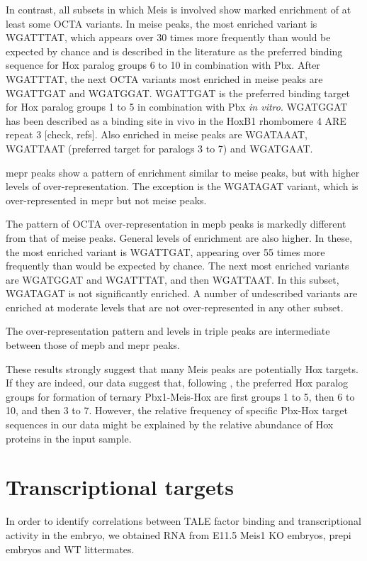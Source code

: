 In contrast, all subsets in which Meis is involved show marked enrichment of at least some \ac{OCTA} variants. In \ac{meise} peaks, the most enriched variant is WGATTTAT, which appears over 30 times more frequently than would be expected by chance and is described in the literature as the preferred binding sequence for Hox paralog groups 6 to 10 in combination with Pbx. After WGATTTAT, the next \ac{OCTA} variants most enriched in \ac{meise} peaks are WGATTGAT and WGATGGAT. WGATTGAT is the preferred binding target for Hox paralog groups 1 to 5 in combination with Pbx \textit{in vitro}. WGATGGAT has been described as a binding site in vivo in the HoxB1 rhombomere 4 \ac{ARE} repeat 3 [check, refs]. Also enriched in \ac{meise} peaks are WGATAAAT, WGATTAAT (preferred target for paralogs 3 to 7) and WGATGAAT. 

\ac{mepr} peaks show a pattern of enrichment similar to \ac{meise} peaks, but with higher levels of over-representation. The exception is the WGATAGAT variant, which is over-represented in \ac{mepr} but not \ac{meise} peaks. 

The pattern of \ac{OCTA} over-representation in \ac{mepb} peaks is markedly different from that of \ac{meise} peaks. General levels of enrichment are also higher. In these, the most enriched variant is WGATTGAT, appearing over 55 times more frequently than would be expected by chance. The next most enriched variants are WGATGGAT and WGATTTAT, and then WGATTAAT. In this subset, WGATAGAT is not significantly enriched. A number of undescribed variants are enriched at moderate levels that are not over-represented in any other subset. 

The over-representation pattern and levels in triple peaks are intermediate between those of \ac{mepb} and \ac{mepr} peaks. 

These results strongly suggest that many Meis peaks are potentially Hox targets. If they are indeed, our data suggest that, following \cite{Shen1997}, the preferred Hox paralog groups for formation of ternary Pbx1-Meis-Hox are first groups 1 to 5, then 6 to 10, and then 3 to 7. However, the relative frequency of specific Pbx-Hox target sequences in our data might be explained by the relative abundance of Hox proteins in the input sample.

\section{Transcriptional targets}

In order to identify correlations between \ac{TALE} factor binding and transcriptional activity in the embryo, we obtained RNA from E11.5 Meis1 \ac{KO} embryos, \ac{prepi} embryos and \ac{WT} littermates. 

